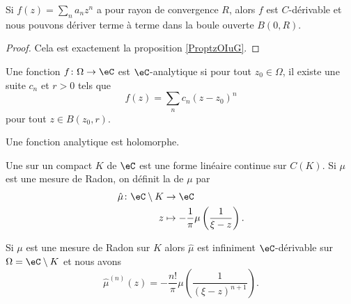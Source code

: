 \begin{proposition}     \label{PropRZCKeO}
    Si \( f(z)=\sum_na_nz^n\) a pour rayon de convergence \( R\), alors \( f\) est $C$-dérivable et nous pouvons dériver terme à terme dans la boule ouverte \( B(0,R)\).
\end{proposition}

\begin{proof}
    Cela est exactement la proposition \ref{ProptzOIuG}.
\end{proof}

\begin{definition}
    Une fonction \( f\colon \Omega\to \eC\) est \( \eC\)-analytique si pour tout \( z_0\in\Omega\), il existe une suite \( c_n\) et \( r>0\) tels que
    \begin{equation}
        f(z)=\sum_n c_n(z-z_0)^n
    \end{equation}
    pour tout \( z\in B(z_0,r)\).
\end{definition}

\begin{proposition}
    Une fonction analytique est holomorphe.
\end{proposition}

\begin{definition}
    Une  sur un compact \(  K\) de \( \eC\) est une forme linéaire continue sur \( C(K)\). Si \( \mu\) est une mesure de Radon, on définit la  de \( \mu\) par 
    \begin{equation}
        \begin{aligned}
            \hat \mu\colon \eC\setminus K&\to \eC \\
            z&\mapsto -\frac{1}{ \pi }\mu\left( \frac{1}{ \xi-z } \right). 
        \end{aligned}
    \end{equation}
\end{definition}

\begin{theorem}     \label{ThoJVNTzn}
    Si \( \mu\) est une mesure de Radon sur \( K\) alors \( \hat \mu\) est infiniment \( \eC\)-dérivable sur \( \Omega=\eC\setminus K\) et nous avons
    \begin{equation}
        \hat\mu^{(n)}(z)=-\frac{ n! }{ \pi }\mu\left( \frac{1}{ (\xi-z)^{n+1} } \right).
    \end{equation}
\end{theorem}

